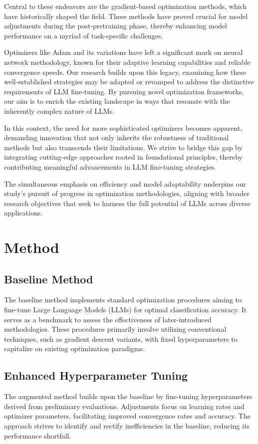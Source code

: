 \documentclass{article} %
\begin{document}
Central to these endeavors are the gradient-based optimization methods, which have historically shaped the field. These methods have proved crucial for model adjustments during the post-pretraining phase, thereby enhancing model performance on a myriad of task-specific challenges.

Optimizers like Adam and its variations have left a significant mark on neural network methodology, known for their adaptive learning capabilities and reliable convergence speeds. Our research builds upon this legacy, examining how these well-established strategies may be adapted or revamped to address the distinctive requirements of LLM fine-tuning. By pursuing novel optimization frameworks, our aim is to enrich the existing landscape in ways that resonate with the inherently complex nature of LLMs.

In this context, the need for more sophisticated optimizers becomes apparent, demanding innovation that not only inherits the robustness of traditional methods but also transcends their limitations. We strive to bridge this gap by integrating cutting-edge approaches rooted in foundational principles, thereby contributing meaningful advancements in LLM fine-tuning strategies.

The simultaneous emphasis on efficiency and model adaptability underpins our study’s pursuit of progress in optimization methodologies, aligning with broader research objectives that seek to harness the full potential of LLMs across diverse applications.

\section{Method}
\label{sec:method}
\subsection{Baseline Method}
The baseline method implements standard optimization procedures aiming to fine-tune Large Language Models (LLMs) for optimal classification accuracy. It serves as a benchmark to assess the effectiveness of later-introduced methodologies. These procedures primarily involve utilizing conventional techniques, such as gradient descent variants, with fixed hyperparameters to capitalize on existing optimization paradigms.

\subsection{Enhanced Hyperparameter Tuning}
The augmented method builds upon the baseline by fine-tuning hyperparameters derived from preliminary evaluations. Adjustments focus on learning rates and optimizer parameters, facilitating improved convergence rates and accuracy. The approach strives to identify and rectify inefficiencies in the baseline, reducing its performance shortfall.
\end{document}
